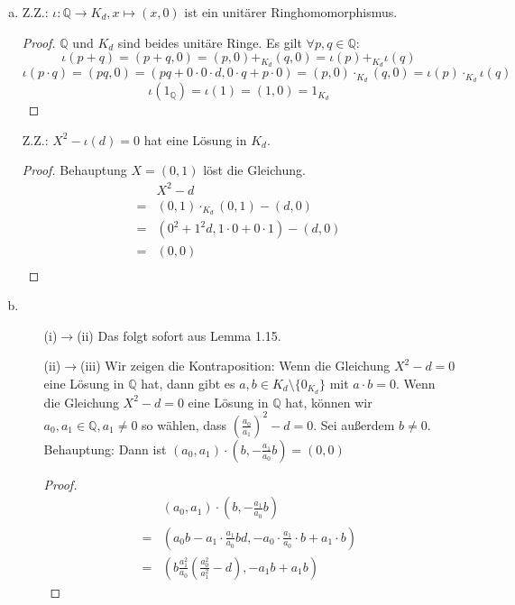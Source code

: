 \documentclass{article}
\begin{document}
\begin{enumerate}[a)]
\begin{proof}
			Bew.:
				\[(1,0)\cdot_{K_d}(a_0, a_1) = (1\cdot a_0 + 0\cdot a_1 \cdot d, 1\cdot a_1 + 0\cdot a_0) = (a_0, a_1)  = (a_0\cdot 1 + a_1\cdot 0 \cdot d, a_1\cdot 1 + a_0\cdot 0) = (a_0, a_1)\cdot_{K_d}(1,0)\]
			\end{proof}
		\item Z.Z.: $\iota: \mathbb{Q} \to K_d, x\mapsto (x,0)$ ist ein unitärer Ringhomomorphismus.
			\begin{proof}
			$\mathbb{Q}$ und $K_d$ sind beides unitäre Ringe. Es gilt $\forall p, q\in \mathbb{Q}:$
			\[\iota(p+q) = (p+q, 0) = (p, 0) +_{K_d} (q, 0) = \iota(p) +_{K_d} \iota(q)\]
			\[\iota(p\cdot q) = (pq, 0) = (pq + 0\cdot 0\cdot d, 0\cdot q + p\cdot 0) = (p, 0)\cdot_{K_d} (q,0) = \iota(p)\cdot_{K_d}\iota(q)\]
			\[\iota(1_\mathbb{Q}) = \iota(1) = (1,0) = 1_{K_d}\]\end{proof}
			Z.Z.: $X^2 -\iota(d) = 0$ hat eine Lösung in $K_d$.
			\begin{proof}
				Behauptung $X = (0,1)$ löst die Gleichung.
				\begin{align*}
					 &X^2 -d\\
					=&(0, 1)\cdot_{K_d}(0, 1) - (d,0)\\
					=&(0^2 + 1^2d, 1\cdot 0 + 0\cdot 1) -(d, 0)\\
					=&(0, 0)\\
				\end{align*}
			\end{proof}
	\item\ \begin{itemize}
		\item[(i)$\to$(ii)] Das folgt sofort aus Lemma 1.15.
		\item[(ii)$\to$(iii)] Wir zeigen die Kontraposition: Wenn die Gleichung $X^2-d = 0$ eine Lösung in $\mathbb{Q}$ hat, dann gibt es $a, b\in K_d\setminus\{0_{K_d}\}$ mit $a\cdot b = 0$. Wenn die Gleichung $X^2-d = 0$ eine Lösung in $\mathbb{Q}$ hat, können wir $a_0, a_1\in \mathbb{Q}, a_1\neq 0$ so wählen, dass $\left(\frac{a_0}{a_1}\right)^2-d = 0$. Sei außerdem $b \neq 0$.\\
		Behauptung: Dann ist $(a_0, a_1) \cdot (b, -\frac{a_1}{a_0} b) = (0,0)$
		\begin{proof}
			\begin{align*}
				 &(a_0, a_1) \cdot \left(b, -\frac{a_1}{a_0} b\right)\\
				=&\left(a_0b - a_1\cdot\frac{a_1}{a_0} b d, - a_0 \cdot \frac{a_1}{a_0}\cdot b + a_1 \cdot b\right)\\
				=&\left(b\frac{a_1^2}{a_0} \left(\frac{a_0^2}{a_1^2} - d\right), -a_1b+ a_1b\right)

\end{align*}
\end{proof}
\end{itemize}
\end{enumerate}
\end{document}
